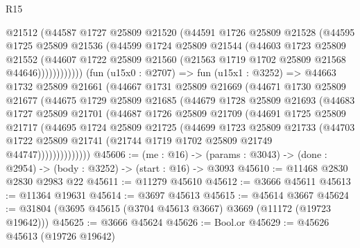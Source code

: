 \begin{lexlean}{R15}
\begin{coremodule}
                  @21512
                  (@44587
                    @1727
                    @25809
                    @21520
                    (@44591
                      @1726
                      @25809
                      @21528
                      (@44595
                        @1725
                        @25809
                        @21536
                        (@44599
                          @1724
                          @25809
                          @21544
                          (@44603
                            @1723
                            @25809
                            @21552
                            (@44607
                              @1722
                              @25809
                              @21560
                              (@21563 @1719 @1702 @25809 @21568 @44646))))))))))))
        (fun (u15x0 : @2707) =>
        fun (u15x1 : @3252) =>
        @44663
          @1732
          @25809
          @21661
          (@44667
            @1731
            @25809
            @21669
            (@44671
              @1730
              @25809
              @21677
              (@44675
                @1729
                @25809
                @21685
                (@44679
                  @1728
                  @25809
                  @21693
                  (@44683
                    @1727
                    @25809
                    @21701
                    (@44687
                      @1726
                      @25809
                      @21709
                      (@44691
                        @1725
                        @25809
                        @21717
                        (@44695
                          @1724
                          @25809
                          @21725
                          (@44699
                            @1723
                            @25809
                            @21733
                            (@44703
                              @1722
                              @25809
                              @21741
                              (@21744 @1719 @1702 @25809 @21749 @44747))))))))))))))
@45606 := (me : @16) ->
  (params : @3043) -> (done : @2954) -> (body : @3252) -> (start : @16) -> @3093
@45610 := @11468 @2830 @2830 @2983 @22
@45611 := @11279 @45610
@45612 := @3666 @45611
@45613 := @11364 @19631
@45614 := @3697 @45613
@45615 := @45614 @3667
@45624 := @31804 (@3695 @45615 (@3704 @45613 @3667) @3669 (@11172 (@19723 @19642)))
@45625 := @3666 @45624
@45626 := Bool.or
@45629 := @45626 @45613 (@19726 @19642)

\end{coremodule}
\end{lexlean}
